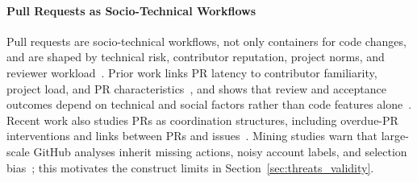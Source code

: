 \documentclass[10pt,conference,anonymous]{IEEEtran}
\begin{document}
\paragraph{Pull Requests as Socio-Technical Workflows}
Pull requests are socio-technical workflows, not only containers for code changes, and are shaped by technical risk, contributor reputation, project norms, and reviewer workload~\cite{tsayInfluenceSocialTechnical2014,kononenkoStudyingPullRequest2018}.
Prior work links PR latency to contributor familiarity, project load, and PR characteristics~\cite{yuWaitItDeterminants2015}, and shows that review and acceptance outcomes depend on technical and social factors rather than code features alone~\cite{deyEffectTechnicalSocial2020}.
Recent work also studies PRs as coordination structures, including overdue-PR interventions and links between PRs and issues~\cite{maddilaNudgeAcceleratingOverdue2023,desouzaRevealingSoftwareDevelopment2024}.
Mining studies warn that large-scale GitHub analyses inherit missing actions, noisy account labels, and selection bias~\cite{kalliamvakouPromisesPerilsMining2014}; this motivates the construct limits in Section~\ref{sec:threats_validity}.
\end{document}
